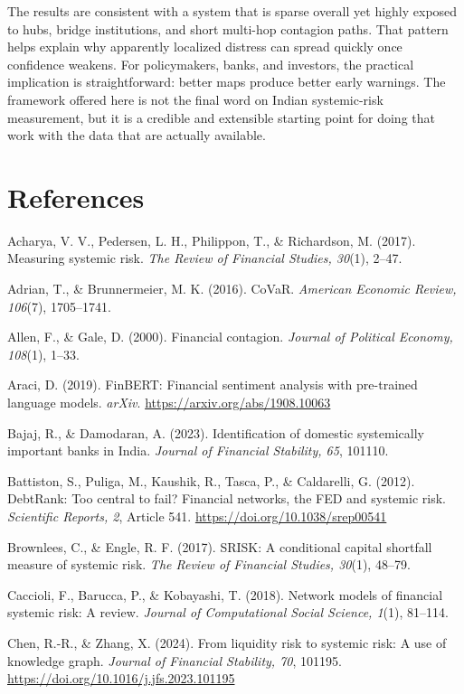\documentclass[12pt]{article}
\newcommand{\aparef}[1]{\par\noindent\hangindent=0.5in\hangafter=1 #1\par}
\begin{document}
The results are consistent with a system that is sparse overall yet highly exposed to hubs, bridge institutions, and short multi-hop contagion paths. That pattern helps explain why apparently localized distress can spread quickly once confidence weakens. For policymakers, banks, and investors, the practical implication is straightforward: better maps produce better early warnings. The framework offered here is not the final word on Indian systemic-risk measurement, but it is a credible and extensible starting point for doing that work with the data that are actually available.

\section*{References}

\aparef{Acharya, V. V., Pedersen, L. H., Philippon, T., \& Richardson, M. (2017). Measuring systemic risk. \textit{The Review of Financial Studies, 30}(1), 2--47.}

\aparef{Adrian, T., \& Brunnermeier, M. K. (2016). CoVaR. \textit{American Economic Review, 106}(7), 1705--1741.}

\aparef{Allen, F., \& Gale, D. (2000). Financial contagion. \textit{Journal of Political Economy, 108}(1), 1--33.}

\aparef{Araci, D. (2019). FinBERT: Financial sentiment analysis with pre-trained language models. \textit{arXiv}. \url{https://arxiv.org/abs/1908.10063}}

\aparef{Bajaj, R., \& Damodaran, A. (2023). Identification of domestic systemically important banks in India. \textit{Journal of Financial Stability, 65}, 101110.}

\aparef{Battiston, S., Puliga, M., Kaushik, R., Tasca, P., \& Caldarelli, G. (2012). DebtRank: Too central to fail? Financial networks, the FED and systemic risk. \textit{Scientific Reports, 2}, Article 541. \url{https://doi.org/10.1038/srep00541}}

\aparef{Brownlees, C., \& Engle, R. F. (2017). SRISK: A conditional capital shortfall measure of systemic risk. \textit{The Review of Financial Studies, 30}(1), 48--79.}

\aparef{Caccioli, F., Barucca, P., \& Kobayashi, T. (2018). Network models of financial systemic risk: A review. \textit{Journal of Computational Social Science, 1}(1), 81--114.}

\aparef{Chen, R.-R., \& Zhang, X. (2024). From liquidity risk to systemic risk: A use of knowledge graph. \textit{Journal of Financial Stability, 70}, 101195. \url{https://doi.org/10.1016/j.jfs.2023.101195}}
\end{document}
